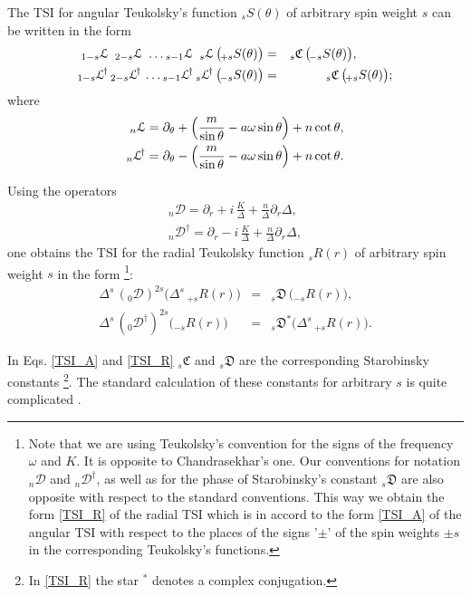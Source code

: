 \documentclass[prd,aps,twocolumn,leterpaper,preprintnumbers]{revtex4}
\numberwithin{equation}{section}
\newcommand{\ben}{\begin{eqnarray}}
\newcommand{\een}{\end{eqnarray}}
\newcommand{\la}{\label}
\begin{document}
The TSI for angular Teukolsky's function  ${}_{s}S(\theta)$
of arbitrary spin weight $s$ can be written in the form
%
\ben
\la{TSI_A}
{}_{1-s}\mathcal{L}\,\,\,{}_{2-s}\mathcal{L}\,\,\dots{}_{s-1}\mathcal{L}\,\,\,{}_{s}\mathcal{L}\,\big({}_{\!+s} S(\theta)\big)&=& {}_{s}\mathfrak{C}\,\big({}_{\!-s}S(\theta)\big),\hskip 1truecm\\
{}_{1-s}\mathcal{L}^{\!\dag}\,{}_{2-s}\mathcal{L}^{\!\dag}\,\dots{}_{s-1}\mathcal{L}^{\!\dag}\,{}_{s}\mathcal{L}^{\!\dag}
\,\big({}_{\!-s}S(\theta)\big)&=&{}_{s}\mathfrak{C}\,\big({}_{\!+s}S(\theta)\big);
\nonumber
\een
%
where
%
\ben
{}_{n}\mathcal{L}=\partial_\theta+\left({m\over{\sin\theta}}-a\omega\sin\theta\right)+n\cot\theta,
\\
{}_{n}\mathcal{L}^{\!\dag}=\partial_\theta-\left({m\over{\sin\theta}}-a\omega\sin\theta\right)+n\cot\theta.
\nonumber
\een
%

Using the operators
%
\ben
\la{TSI_RD}
{}_n\mathcal{D}=\partial_r+i\,{\frac K \Delta}+{\frac n \Delta}\partial_r\Delta,\\
{}_n\mathcal{D}^{\dag}=\partial_r-i\,{\frac K \Delta}+{\frac n \Delta}\partial_r\Delta,\nonumber
\een
%
one obtains the TSI for the radial Teukolsky function  ${}_{s}R(r)$ of arbitrary spin weight $s$
in the form \footnote{Note that we are using Teukolsky's convention for the signs
of the frequency $\omega$ and $K$. It is opposite to Chandrasekhar's one.
Our conventions for notation ${}_n\mathcal{D}$ and ${}_n\mathcal{D}^{\dag}$,
as well as for the phase of Starobinsky's constant ${}_{s}\mathfrak{D}$
are also opposite with respect to the standard conventions.
This way we obtain the form \eqref{TSI_R} of the radial TSI
which is in accord to the form \eqref{TSI_A} of the angular TSI
with respect to the places of the signs '$\pm$' of the spin weights $\pm s$
in the corresponding Teukolsky's functions.}:
%
\ben
\la{TSI_R}
\Delta^s\,\left({}_0\mathcal{D}\right)^{2s}\big(\Delta^s\,{}_{+s}R(r)\big)&=&
{}_{s}\mathfrak{D}\,\big({}_{-s}R(r)\big),\\
\Delta^s\,\left({}_0\mathcal{D}^\dag\right)^{2s}\big({}_{-s}R(r)\big)&=&
{}_{s}\mathfrak{D}^*\!\big(\Delta^s\,{}_{+s}R(r)\big).\nonumber
\een
%

In Eqs. \eqref{TSI_A} and \eqref{TSI_R} ${}_{s}\mathfrak{C}$ and ${}_{s}\mathfrak{D}$
are the corresponding Starobinsky constants \footnote{In \eqref{TSI_R} the star ${}^*$ denotes a complex conjugation.}.
The standard calculation of these constants for arbitrary $s$
is quite complicated \cite{Chandra,ChandraMT}.
\end{document}
